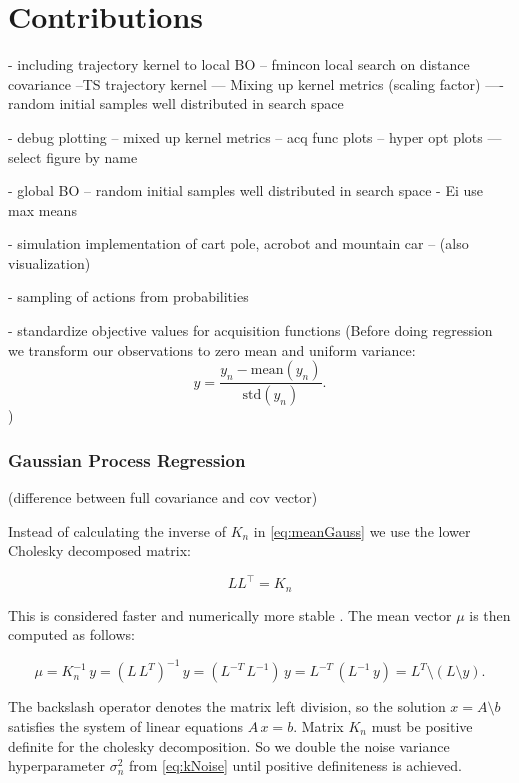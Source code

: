 \chapter{Contributions}
\label{chap:contributions}

- including trajectory kernel to local BO
-- fmincon local search on distance covariance
--TS trajectory kernel
--- Mixing up kernel metrics (scaling factor)
---- random initial samples well distributed in search space

- debug plotting
-- mixed up kernel metrics
-- acq func plots
-- hyper opt plots
--- select figure by name

- global BO
-- random initial samples well distributed in search space
- Ei use max means

- simulation implementation of cart pole, acrobot and mountain car
-- (also visualization)

- sampling of actions from probabilities

- standardize objective values for acquisition functions
(Before doing regression we transform our observations to zero mean and uniform variance:
$$y = \frac{y_{n}-\mathrm{mean}(y_{n})}{\mathrm{std}(y_{n})}.$$)

\subsection{Gaussian Process Regression}

(difference between full covariance and cov vector)

Instead of calculating the inverse of $K_n$ in \eqref{eq:meanGauss} we use the lower Cholesky decomposed matrix:

$$LL^\top=K_n$$

This is considered faster and numerically more stable \cite{rasmussen2006gaussian}. The mean vector $\mu$ is then computed as follows:

\begin{equation} \label{eq:regression}
    \mu = K_n^{-1}\,y = (L\,L^{T})^{-1}\,y = (L^{-T}\,L^{-1})\,y = L^{-T}\,(L^{-1}\,y) = L^{T}\setminus(L \setminus y).
\end{equation}

The backslash operator denotes the matrix left division, so the solution $x=A\setminus b$ satisfies the system of linear equations $A\,x=b$.
Matrix $K_n$ must be positive definite for the cholesky decomposition. So we double the noise variance hyperparameter $\sigma_n^2$ from \eqref{eq:kNoise} until positive definiteness is achieved.


